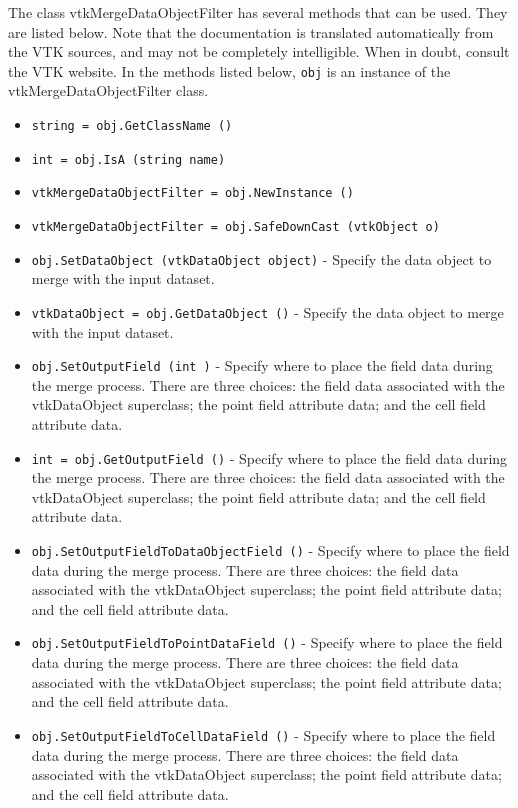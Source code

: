 The class vtkMergeDataObjectFilter has several methods that can be used.
  They are listed below.
Note that the documentation is translated automatically from the VTK sources,
and may not be completely intelligible.  When in doubt, consult the VTK website.
In the methods listed below, \verb|obj| is an instance of the vtkMergeDataObjectFilter class.
\begin{itemize}
\item  \verb|string = obj.GetClassName ()|

\item  \verb|int = obj.IsA (string name)|

\item  \verb|vtkMergeDataObjectFilter = obj.NewInstance ()|

\item  \verb|vtkMergeDataObjectFilter = obj.SafeDownCast (vtkObject o)|

\item  \verb|obj.SetDataObject (vtkDataObject object)| -  Specify the data object to merge with the input dataset.

\item  \verb|vtkDataObject = obj.GetDataObject ()| -  Specify the data object to merge with the input dataset.

\item  \verb|obj.SetOutputField (int )| -  Specify where to place the field data during the merge process.  There
 are three choices: the field data associated with the vtkDataObject
 superclass; the point field attribute data; and the cell field attribute
 data.

\item  \verb|int = obj.GetOutputField ()| -  Specify where to place the field data during the merge process.  There
 are three choices: the field data associated with the vtkDataObject
 superclass; the point field attribute data; and the cell field attribute
 data.

\item  \verb|obj.SetOutputFieldToDataObjectField ()| -  Specify where to place the field data during the merge process.  There
 are three choices: the field data associated with the vtkDataObject
 superclass; the point field attribute data; and the cell field attribute
 data.

\item  \verb|obj.SetOutputFieldToPointDataField ()| -  Specify where to place the field data during the merge process.  There
 are three choices: the field data associated with the vtkDataObject
 superclass; the point field attribute data; and the cell field attribute
 data.

\item  \verb|obj.SetOutputFieldToCellDataField ()| -  Specify where to place the field data during the merge process.  There
 are three choices: the field data associated with the vtkDataObject
 superclass; the point field attribute data; and the cell field attribute
 data.

\end{itemize}
